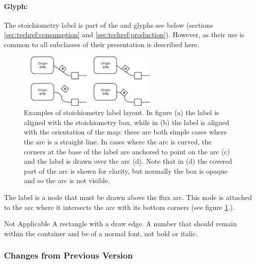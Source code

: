 \paragraph{Glyph: }
\label{defn:stoichlabel}

The stoichiometry label is part of the  and
 glyphs see below (sections
\ref{sec:techref:consumption} and \ref{sec:techref:production}). However, as their use
is common to all subclasses of  their presentation
is described here.

\begin{figure}[htb]
  \centering
  \includegraphics[width=0.6\textwidth]{images/stoichlabellayout}
  \caption{Examples of stoichiometry label layout. In figure (a) the
    label is aligned with the stoichiometry box, while in (b) the
    label is aligned with the orientation of the map: these are both
    simple cases where the arc is a straight line. In cases where the
    arc is curved, the corners at the base of the label are anchored
    to point on the arc (c) and the label is drawn over the arc
    (d). Note that in (d) the covered part of the arc is shown for
    clarity, but normally the box is opaque and so the arc is not
    visible.}
  \label{fig:techref:stoichlabellayout}
\end{figure}

The label is a node that must be drawn above the flux arc. This node
is attached to the arc where it intersects the arc with its bottom
corners (see figure \ref{fig:techref:stoichlabellayout}.).

\begin{glyphDescription}
\glyphSboTerm Not Applicable
\glyphContainer A rectangle with a draw edge.
\glyphLabel A number that should remain within the container and be of
a normal font, \ie not bold or italic.
\end{glyphDescription}


\subsubsection{Changes from Previous Version}

